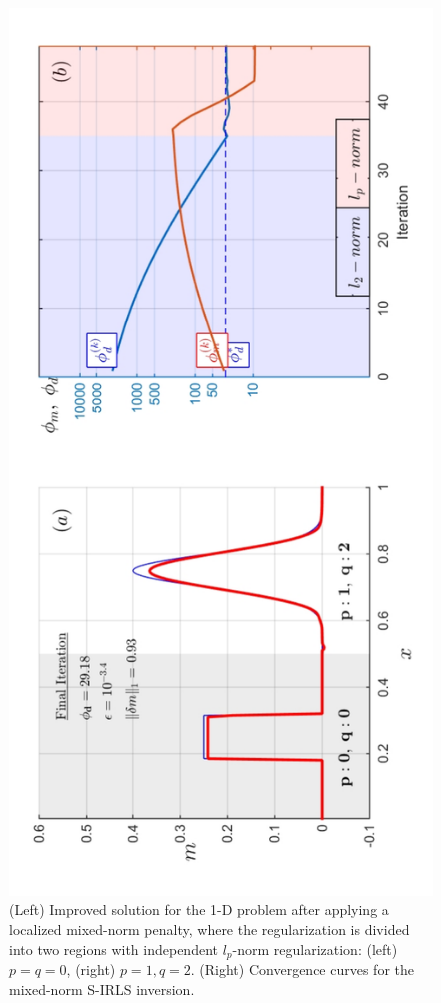 \begin{figure}[t]
\centering
\includegraphics[scale=0.56, angle=270]{1D_Mixed_norm}
\caption{(Left) Improved solution for the 1-D problem after applying a localized mixed-norm penalty, where the regularization is divided into two regions with independent $l_p$-norm regularization: (left) $p = q = 0$, (right) $p=1 , q=2$. (Right) Convergence curves for the mixed-norm S-IRLS inversion.}
\label{fig:1D_Mixed_norm}
\end{figure}

